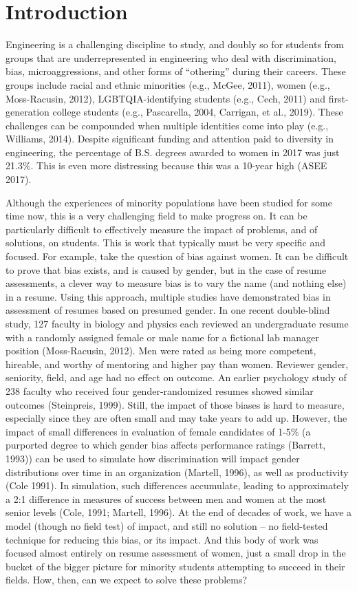 \section{Introduction}
\label{sec:intro}

 
Engineering is a challenging discipline to study, and doubly so for students from groups that are underrepresented in engineering who deal with discrimination, bias, microaggressions, and other forms of “othering” during their careers. These groups include racial and ethnic minorities (e.g., McGee, 2011), women (e.g., Moss-Racusin, 2012), LGBTQIA-identifying students (e.g., Cech, 2011) and first-generation college students (e.g., Pascarella, 2004, Carrigan, et al., 2019). These challenges can be compounded when multiple identities come into play (e.g., Williams, 2014). Despite significant funding and attention paid to diversity in engineering, the percentage of B.S. degrees awarded to women in 2017 was just 21.3\%.  This is even more distressing because this was a 10-year high (ASEE 2017). 

 
Although the experiences of minority populations have been studied for some time now, this is a very challenging field to make progress on. It can be particularly difficult to effectively measure the impact of problems, and of solutions, on students. This is work that typically must be very specific and focused. For example, take the question of bias against women. It can be difficult to prove that bias exists, and is caused by gender, but in the case of resume assessments, a clever way to measure bias is to vary the name (and nothing else) in a resume. Using this approach, multiple studies have demonstrated bias in assessment of resumes based on presumed gender. In one recent double-blind study, 127 faculty in biology and physics each reviewed an undergraduate resume with a randomly assigned female or male name for a fictional lab manager position (Moss-Racusin, 2012). Men were rated as being more competent, hireable, and worthy of mentoring and higher pay than women. Reviewer gender, seniority, field, and age had no effect on outcome. An earlier psychology study of 238 faculty who received four gender-randomized resumes showed similar outcomes (Steinpreis, 1999). Still, the impact of those biases is hard to measure, especially since they are often small and may take years to add up. However, the impact of small differences in evaluation of female candidates of 1-5\% (a purported degree to which gender bias affects performance ratings (Barrett, 1993)) can be used to simulate how discrimination will impact gender distributions over time in an organization (Martell, 1996), as well as productivity (Cole 1991). In simulation, such differences accumulate, leading to approximately a 2:1 difference in measures of success between men and women at the most senior levels (Cole, 1991; Martell, 1996). At the end of decades of work, we have a model (though no field test) of impact, and still no solution -- no field-tested technique for reducing this bias, or its impact. And this body of work was focused almost entirely on resume assessment of women, just a small drop in the bucket of the bigger picture for minority students attempting to succeed in their fields. How, then, can we expect to solve these problems? 
 
